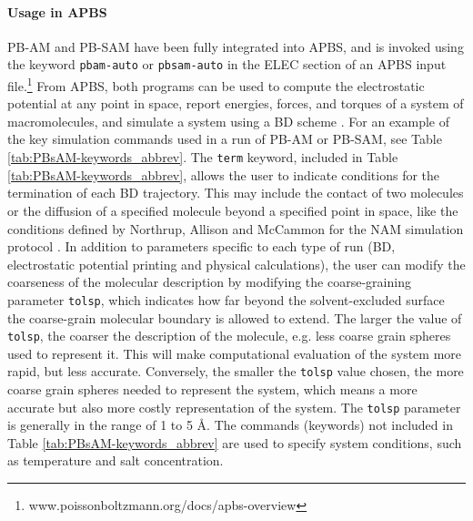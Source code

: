 \documentclass[journal=jpcbfk, manuscript=article]{achemso}
\begin{document}
\paragraph{Usage in APBS}
PB-AM and PB-SAM have been fully integrated into APBS, and is invoked using the keyword \texttt{pbam-auto} or \texttt{pbsam-auto} in the ELEC section of an APBS input file.\footnote{www.poissonboltzmann.org/docs/apbs-overview} From APBS, both programs can be used to compute the electrostatic potential at any point in space, report energies, forces, and torques of a system of macromolecules, and simulate a system using a BD scheme \cite{ermak1978}. For an example of the key simulation commands used in a run of PB-AM or PB-SAM, see Table \ref{tab:PBsAM-keywords_abbrev}. The \texttt{term} keyword, included in Table \ref{tab:PBsAM-keywords_abbrev}, allows the user to indicate conditions for the termination of each BD trajectory. This may include the contact of two molecules or the diffusion of a specified molecule beyond a specified point in space, like the conditions defined by Northrup, Allison and McCammon for the NAM simulation protocol \cite{northrup1984}. In addition to parameters specific to each type of run (BD, electrostatic potential printing and physical calculations), the user can modify the coarseness of the molecular description by modifying the coarse-graining parameter \texttt{tolsp}, which indicates how far beyond the solvent-excluded surface the coarse-grain molecular boundary is allowed to extend. The larger the value of \texttt{tolsp}, the coarser the description of the molecule, e.g. less coarse grain spheres used to represent it. This will make computational evaluation of the system more rapid, but less accurate. Conversely, the smaller the \texttt{tolsp} value chosen, the more coarse grain spheres needed to represent the system, which means a more accurate but also more costly representation of the system. The \texttt{tolsp} parameter is generally in the range of 1 to 5 \AA. The commands (keywords) not included in Table \ref{tab:PBsAM-keywords_abbrev} are used to specify system conditions, such as temperature and salt concentration.
\end{document}
